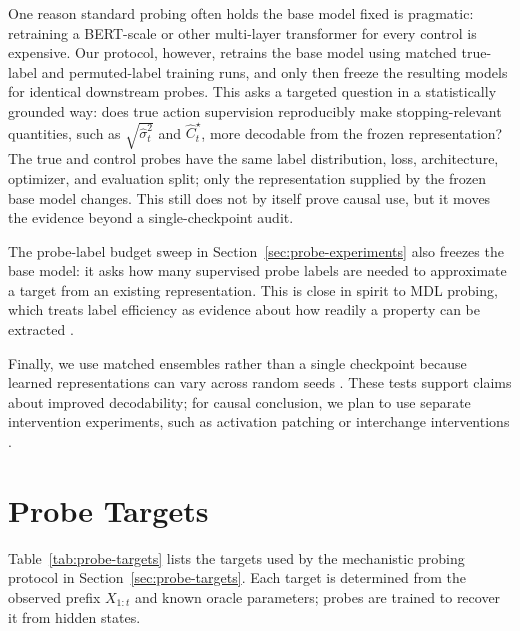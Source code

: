 \documentclass[11pt]{article}
\begin{document}
One reason standard probing often holds the base model fixed is pragmatic: retraining a BERT-scale or other multi-layer transformer for every control is expensive. Our protocol, however, retrains the base model using matched true-label and permuted-label training runs, and only then freeze the resulting models for identical downstream probes. This asks a targeted question in a statistically grounded way: does true action supervision reproducibly make stopping-relevant quantities, such as $\sqrt{\hat\sigma_t^2}$ and $\widehat C_t^\star$, more decodable from the frozen representation? The true and control probes have the same label distribution, loss, architecture, optimizer, and evaluation split; only the representation supplied by the frozen base model changes. This still does not by itself prove causal use, but it moves the evidence beyond a single-checkpoint audit.

The probe-label budget sweep in Section~\ref{sec:probe-experiments} also freezes the base model: it asks how many supervised probe labels are needed to approximate a target from an existing representation. This is close in spirit to MDL probing, which treats label efficiency as evidence about how readily a property can be extracted \citep{voita_titov_2020_mdl}. 

Finally, we use matched ensembles rather than a single checkpoint because learned representations can vary across random seeds \citep{mccoy_min_linzen_2020_berts}. These tests support claims about improved decodability; for causal conclusion, we plan to use separate intervention experiments, such as activation patching or interchange interventions \citep{geiger_causal_2021}. 


\section{Probe Targets}
\label{app:probe-targets}

Table~\ref{tab:probe-targets} lists the targets used by the mechanistic probing protocol in Section~\ref{sec:probe-targets}. Each target is determined from the observed prefix \(X_{1:t}\) and known oracle parameters; probes are trained to recover it from hidden states.
\end{document}
